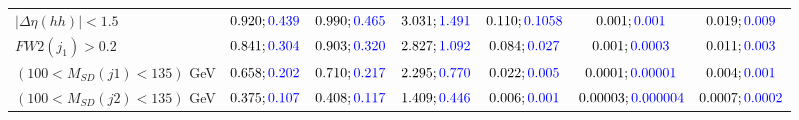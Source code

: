 \begin{landscape}
\begin{table}
\begin{tabular}{lcccccc}
				\rowcolor{black!7}$|\Delta\eta(hh)|<1.5$& $0.920;\textcolor{blue}{0.439}$&$0.990;\textcolor{blue}{0.465}$ &$3.031;\textcolor{blue}{1.491}$ &$0.110;\textcolor{blue}{0.1058}$ &$0.001;\textcolor{blue}{0.001}$ &$0.019;\textcolor{blue}{0.009}$\\
				$FW2(j_1)>0.2$ &$0.841;\textcolor{blue}{0.304}$ &$0.903;\textcolor{blue}{0.320}$&$2.827;\textcolor{blue}{1.092}$&$0.084;\textcolor{blue}{0.027}$&$0.001;\textcolor{blue}{0.0003}$&$0.011;\textcolor{blue}{0.003}$\\
				\rowcolor{black!7}$(100<M_{SD}(j1)<135)$ GeV& $0.658;\textcolor{blue}{0.202}$&$0.710;\textcolor{blue}{0.217}$&$2.295;\textcolor{blue}{0.770}$&$0.022;\textcolor{blue}{0.005}$&$0.0001;\textcolor{blue}{0.00001}$&$0.004;\textcolor{blue}{0.001}$\\
				$(100<M_{SD}(j2)<135)$ GeV &$0.375;\textcolor{blue}{0.107}$ &$0.408;\textcolor{blue}{0.117}$ &$1.409;\textcolor{blue}{0.446}$&$0.006;\textcolor{blue}{0.001}$&$0.00003;\textcolor{blue}{0.000004}$&$0.0007;\textcolor{blue}{0.0002}$\\
				\bottomrule
			\end{tabular}
		\end{table}
		

\end{landscape}
